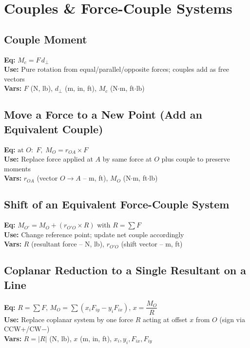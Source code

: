 \documentclass[10pt]{article}
\begin{document}
\section{Couples \& Force-Couple Systems}
\begin{multicols}{2}
    \subsection{Couple Moment}
    \textbf{Eq:} $M_c = F\,d_{\perp}$\\
    \textbf{Use:} Pure rotation from equal/parallel/opposite forces; couples add as free vectors\\
    \textbf{Vars:} $F$ (N, lb), $d_{\perp}$ (m, in, ft), $M_c$ (N$\cdot$m, ft$\cdot$lb)\\[2pt]

    \subsection{Move a Force to a New Point (Add an Equivalent Couple)}
    \textbf{Eq:} $\text{at }O:\; F,\; M_O = r_{OA}\times F$\\
    \textbf{Use:} Replace force applied at $A$ by same force at $O$ plus couple to preserve moments\\
    \textbf{Vars:} $r_{OA}$ (vector $O\!\to\!A$ -- m, ft), $M_O$ (N$\cdot$m, ft$\cdot$lb)\\[2pt]

    \subsection{Shift of an Equivalent Force-Couple System}
    \textbf{Eq:} $M_{O'} = M_O + (r_{O'O} \times R)$ \; with $R=\sum F$\\
    \textbf{Use:} Change reference point; update net couple accordingly\\
    \textbf{Vars:} $R$ (resultant force -- N, lb), $r_{O'O}$ (shift vector -- m, ft)\\[2pt]

    \subsection{Coplanar Reduction to a Single Resultant on a Line}
    \textbf{Eq:} $R=\sum F$, \; $M_O=\sum(x_iF_{iy}-y_iF_{ix})$, \; $x=\dfrac{M_O}{R}$\\
    \textbf{Use:} Replace coplanar system by one force $R$ acting at offset $x$ from $O$ (sign via CCW+/CW$-$)\\
    \textbf{Vars:} $R=|R|$ (N, lb), $x$ (m, in, ft), $x_i,y_i,F_{ix},F_{iy}$\\
\end{multicols}
\end{document}
